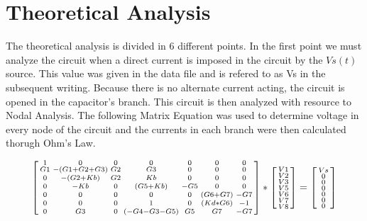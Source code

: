 \section{Theoretical Analysis}
\label{sec:analysis}
The theoretical analysis is divided in 6 different points.
In the first point we must analyze the circuit when a direct current is imposed in the circuit by the $Vs(t)$ source. This value was given in the data file and is refered to as Vs in the subsequent writing. Because there is no alternate current acting, the circuit is opened in the capacitor's branch. This circuit is then analyzed with resource to Nodal Analysis. The following Matrix Equation was used to determine voltage in every node of the circuit and the currents in each branch were then calculated thorugh Ohm's Law.

\begin{equation}
\begin{bsmallmatrix}
1  & 0  & 0  & 0  & 0  & 0  & 0\\
G1  & -(G1 + G2 + G3)  & G2  & G3  & 0  & 0  & 0\\
0  & -(G2 + Kb)  & G2  & Kb  & 0  & 0  & 0\\
0  & -Kb  & 0  & (G5 + Kb)  & -G5  & 0  & 0\\
0  & 0  & 0  & 0  & 0  & (G6 + G7)  & -G7\\
0  & 0  & 0  & 1  & 0  & (Kd * G6)  & -1\\
0  & G3  & 0  & (-G4 - G3 - G5)  & G5  & G7  & -G7
\end{bsmallmatrix}
*
\begin{bsmallmatrix}
V1\\
V2\\
V3\\
V5\\
V6\\
V7\\
V8
\end{bsmallmatrix}
=
\begin{bsmallmatrix}
Vs\\
0\\
0\\
0\\
0\\
0\\
0
\end{bsmallmatrix}
\end{equation}

\vspace{20pt}

